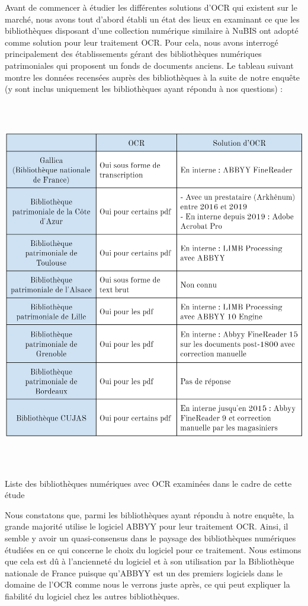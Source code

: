 \documentclass[a4paper,12pt,twoside]{book}
\begin{document}
	Avant de commencer à étudier les différentes solutions d'OCR qui
	existent sur le marché, nous avons tout d'abord établi un état des lieux
	en examinant ce que les bibliothèques disposant d'une collection
	numérique similaire à NuBIS ont adopté comme solution pour leur
	traitement OCR. Pour cela, nous avons interrogé principalement des
	établissements gérant des bibliothèques numériques patrimoniales qui
	proposent un fonds de documents anciens. Le tableau suivant montre les
	données recensées auprès des bibliothèques à la suite de notre
	enquête (y sont inclus uniquement les bibliothèques ayant répondu à nos questions) :  \\
	
	\begin{table} [H]
		\includegraphics[width=6.26806in,height=6.38889in]{vertopal_157ae480aa4a4b07be198b586a812241/media/image12.png}
		\caption{Liste des bibliothèques numériques avec OCR examinées dans le
			cadre de cette étude}
	\end{table}
	
	
	
	Nous constatons que, parmi les bibliothèques ayant répondu à notre
	enquête, la grande majorité utilise le logiciel ABBYY pour leur
	traitement OCR. Ainsi, il semble y avoir un quasi-consensus dans le
	paysage des bibliothèques numériques étudiées en ce qui concerne le
	choix du logiciel pour ce traitement. Nous estimons que cela est dû à
	l'ancienneté du logiciel et à son utilisation par la Bibliothèque nationale de France puisque qu'ABBYY est un des premiers logiciels
	dans le domaine de l'OCR comme nous le verrons juste après, ce qui peut
	expliquer la fiabilité du logiciel chez les autres bibliothèques. \\
	
\end{document}

